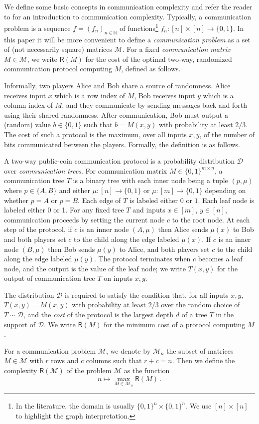 \documentclass{theoretics}
\newcommand{\zo}{\{0,1\}}
\newcommand{\cD}{\ensuremath{\mathcal{D}}}
\newcommand{\cM}{\ensuremath{\mathcal{M}}}
\newcommand{\bN}{\ensuremath{\mathbb{N}}}
\newcommand{\CC}{\mathsf{R}}
\begin{document}
We define some basic concepts in communication complexity and refer the reader to \cite{NK96,RY20}
for an introduction to communication complexity. Typically, a communication problem is a sequence $f =
(f_n)_{n \in \bN}$ of functions\footnote{In the literature, the domain is usually $\zo^n \times
\zo^n$. We use $[n] \times [n]$ to highlight the graph interpretation.} $f_n : [n] \times [n] \to
\zo$. In this paper it will be more convenient to define a \emph{communication problem} as a set of
(not necessarily square) matrices $\cM$. For a fixed \emph{communication matrix} $M \in \cM$, we
write $\CC(M)$ for the cost of the optimal two-way, randomized communication protocol computing $M$,
defined as follows.

Informally, two players Alice and Bob share a source of randomness. Alice receives input $x$ which
is a row index of $M$, Bob receives input $y$ which is a column index of $M$, and they communicate by sending
messages back and forth using their shared randomness. After communication, Bob must output a
(random) value $b \in \zo$ such that $b = M(x,y)$ with probability at least $2/3$. The cost of
such a protocol is the maximum, over all inputs $x, y$, of the number of bits communicated between the
players. Formally, the definition is as follows.

\begin{definition}
\label{def:communication protocol}
A two-way public-coin communication protocol is a probability distribution $\cD$ over
\emph{communication trees}.  For communication matrix $M \in \zo^{m \times n}$, a communication tree
$T$ is a binary tree with each inner node being a tuple $(p,\mu)$ where $p \in \{A,B\}$ and either
$\mu : [n] \to \zo$ or $\mu : [m] \to \zo$ depending on whether $p = A$ or $p = B$. Each edge of $T$
is labeled either $0$ or $1$. Each leaf node is labeled either 0 or 1. For any fixed tree $T$ and
inputs $x \in [m]$, $y \in [n]$, communication proceeds by setting the current node $c$ to the root
node.  At each step of the protocol, if $c$ is an inner node $(A,\mu)$ then Alice sends $\mu(x)$ to
Bob and both players set $c$ to the child along the edge labeled $\mu(x)$. If $c$ is an inner node
$(B,\mu)$ then Bob sends $\mu(y)$ to Alice, and both players set $c$ to the child along the edge
labeled $\mu(y)$.  The protocol terminates when $c$ becomes a leaf node, and the output is the value
of the leaf node; we write $T(x,y)$ for the output of communication tree $T$ on inputs $x,y$.

The distribution $\cD$ is required to satisfy the condition that, for all inputs $x,y$, $T(x,y) = M(x,y)$ with probability
at least $2/3$ over the random choice of $T \sim \cD$, and the \emph{cost} of the protocol is the
largest depth $d$ of a tree $T$ in the support of $\cD$. We write $\CC(M)$ for the minimum cost of a
protocol computing $M$.

For a communication problem $\cM$, we denote by $\cM_n$ the subset of matrices $M \in
\cM$ with $r$ rows and $c$ columns such that $r + c = n$. Then we define the complexity
$\CC(\cM)$ of the problem $\cM$ as the function
\[
  n \mapsto \max_{M \in \cM_n} \CC(M) \,.
\]
\end{definition}
\end{document}
